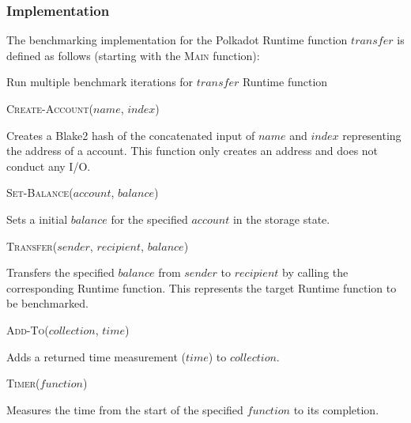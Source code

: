 \documentclass[11pt,a4paper]{article}
\newcommand{\SubItem}[1]{
    {\setlength\itemindent{15pt} \item[-] #1}
}
\begin{document}
\subsubsection*{Implementation}
The benchmarking implementation for the Polkadot Runtime function $transfer$ is defined as
follows (starting with the \textsc{Main} function):
\newline


\begin{algorithm}[H]\label{sec:algo-benchmark-transfer}
  \caption{Run multiple benchmark iterations for $transfer$ Runtime function}
  \SetAlgoLined
  \BlankLine
  \BlankLine
\end{algorithm}

\begin{itemize}
  \item \textsc{Create-Account($name$, $index$)}
      \SubItem{Creates a Blake2 hash of the concatenated input of $name$ and $index$ representing
      the address of a account. This function only creates an address and does not conduct any I/O.}
  \item \textsc{Set-Balance($account$, $balance$)}
      \SubItem{Sets a initial $balance$ for the specified $account$ in the storage state.}
  \item \textsc{Transfer($sender$, $recipient$, $balance$)}
      \SubItem{Transfers the specified $balance$ from $sender$ to $recipient$ by calling the
      corresponding Runtime function. This represents the target Runtime function to be benchmarked.}
  \item \textsc{Add-To($collection$, $time$)}
      \SubItem{Adds a returned time measurement ($time$) to $collection$.}
  \item \textsc{Timer($function$)}
      \SubItem{Measures the time from the start of the specified $function$ to its completion.}
\end{itemize}
\end{document}

